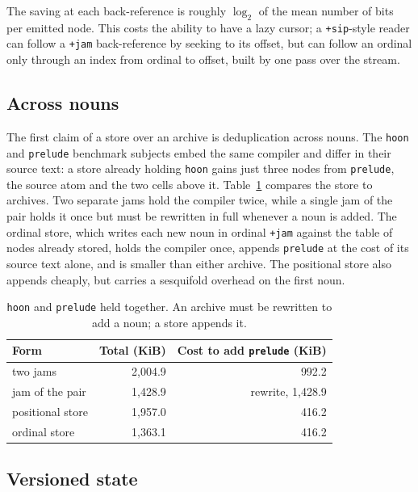 \documentclass[twoside]{article}
\begin{document}
\bigskip
\noindent
The saving at each back-reference is roughly $\log_2$ of the mean number of bits per emitted node.  This costs the ability to have a lazy cursor; a \texttt{+sip}-style reader can follow a \texttt{+jam} back-reference by seeking to its offset, but can follow an ordinal only through an index from ordinal to offset, built by one pass over the stream.

\subsection{Across nouns}

The first claim of a store over an archive is deduplication across nouns.  The \texttt{hoon} and \texttt{prelude} benchmark subjects embed the same compiler and differ in their source text:  a store already holding \texttt{hoon} gains just three nodes from \texttt{prelude}, the source atom and the two cells above it.  Table~\ref{tab:eval-store} compares the store to archives.  Two separate jams hold the compiler twice, while a single jam of the pair holds it once but must be rewritten in full whenever a noun is added.  The ordinal store, which writes each new noun in ordinal \texttt{+jam} against the table of nodes already stored, holds the compiler once, appends \texttt{prelude} at the cost of its source text alone, and is smaller than either archive.  The positional store also appends cheaply, but carries a sesquifold overhead on the first noun.

\begin{table}[ht]
\centering
\caption{\texttt{hoon} and \texttt{prelude} held together.  An archive must be rewritten to add a noun; a store appends it.}
\label{tab:eval-store}
\begin{tabular}{ l r r }
  \hline \hline
  \textbf{Form} & \textbf{Total (KiB)} & \textbf{Cost to add \texttt{prelude} (KiB)} \\
  \hline
  two jams                  & 2,004.9 & 992.2 \\
  jam of the pair           & 1,428.9 & rewrite, 1,428.9 \\
  positional store          & 1,957.0 & 416.2 \\
  ordinal store             & 1,363.1 & 416.2 \\
  \hline
\end{tabular}%
\end{table}

\subsection{Versioned state}
\end{document}
